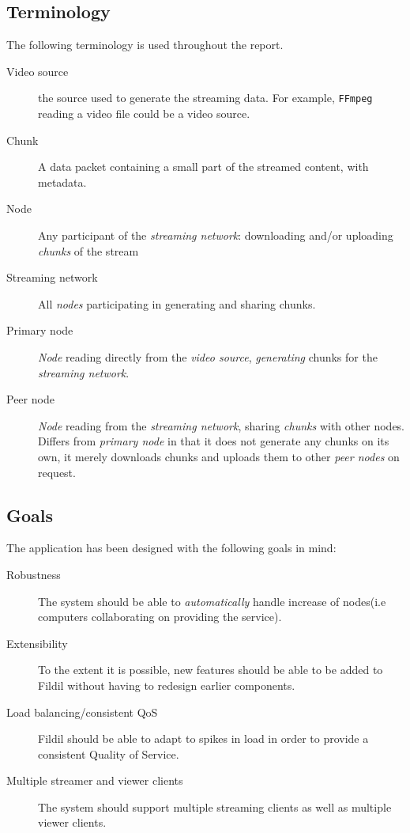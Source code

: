 \documentclass[10pt, a4paper]{article}
\begin{document}
\subsection{Terminology}
\label{sec:terminology}

The following terminology is used throughout the report.

\begin{description}
\item[Video source] the source used to generate the streaming data. For example,
  \texttt{FFmpeg} reading a video file could be a video source.
\item[Chunk] A data packet containing a small part of the streamed
  content, with metadata.
\item[Node] Any participant of the \emph{streaming network}: downloading and/or
  uploading \emph{chunks} of the stream
\item[Streaming network] All \emph{nodes} participating in generating and
  sharing chunks.
\item[Primary node] \emph{Node} reading directly from the \emph{video source},
  \emph{generating} chunks for the \emph{streaming network}.
\item[Peer node] \emph{Node} reading from the \emph{streaming network}, sharing
  \emph{chunks} with other nodes. Differs from \emph{primary node} in that it
  does not generate any chunks on its own, it merely downloads chunks and
  uploads them to other \emph{peer nodes} on request.
\end{description}

\subsection{Goals}
\label{sec:goals}

The application has been designed with the following goals in mind:

\begin{description}
\item[Robustness] The system should be able to \emph{automatically} handle
  increase of nodes(i.e computers collaborating on providing the service).
\item[Extensibility] To the extent it is possible, new features should be able
  to be added to Fildil without having to redesign earlier components.
\item[Load balancing/consistent QoS] Fildil should be able to adapt to spikes in
  load in order to provide a consistent Quality of Service.
\item [Multiple streamer and viewer clients] The system should support multiple
  streaming clients as well as multiple viewer clients.
\end{description}
\end{document}
